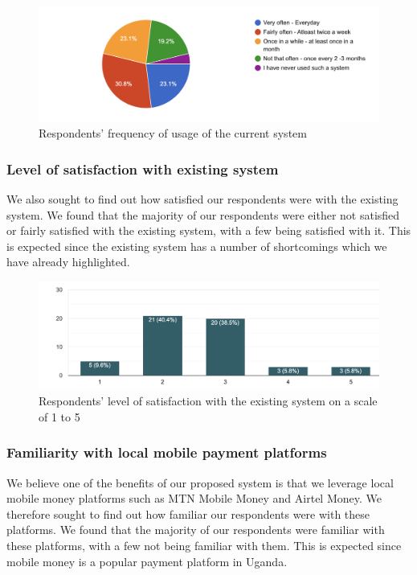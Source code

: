 \begin{figure}[h]
    \begin{center}
        \hspace{-1cm}
        \includegraphics[scale = 0.5]{images/usage}
        \caption{Respondents' frequency of usage of the current system}
    \end{center}
\end{figure}

\subsubsection{Level of satisfaction with existing system}

We also sought to find out how satisfied our respondents were with the existing system. We found that the majority of our respondents were either not satisfied or fairly satisfied with the existing system, with a few being satisfied with it. This is expected since the existing system has a number of shortcomings which we have already highlighted.

\begin{figure}[h]
    \begin{center}
        \hspace{-3cm}
        \includegraphics[scale = 0.5]{images/satisfaction}
        \caption{Respondents' level of satisfaction with the existing system on a scale of 1 to 5}
    \end{center}
\end{figure}

\clearpage

\subsubsection{Familiarity with local mobile payment platforms}
We believe one of the benefits of our proposed system is that we leverage local mobile money platforms such as MTN Mobile Money and Airtel Money. We therefore sought to find out how familiar our respondents were with these platforms. We found that the majority of our respondents were familiar with these platforms, with a few not being familiar with them. This is expected since mobile money is a popular payment platform in Uganda.


